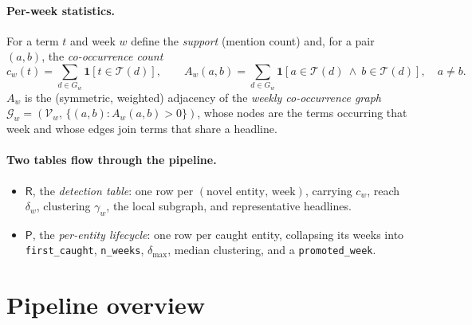 \documentclass[11pt]{article}
\newcommand{\ind}[1]{\mathbf{1}\!\left[#1\right]}        %
\newcommand{\Terms}{\mathcal{T}}                          %
\newcommand{\Vocab}{\mathcal{V}}                          %
\newcommand{\Gw}{G_{w}}                                   %
\renewcommand{\deg}{\delta}                               %
\newcommand{\clu}{\gamma}                                 %
\newcommand{\Rtab}{\mathsf{R}}
\newcommand{\Ptab}{\mathsf{P}}
\theoremstyle{definition}
\theoremstyle{remark}
\begin{document}
\paragraph{Per-week statistics.}
For a term $t$ and week $w$ define the \emph{support} (mention count) and, for a pair $(a,b)$,
the \emph{co-occurrence count}
\begin{equation}
c_w(t)=\sum_{d\in\Gw}\ind{t\in\Terms(d)},\qquad
A_w(a,b)=\sum_{d\in\Gw}\ind{a\in\Terms(d)\ \wedge\ b\in\Terms(d)},\quad a\ne b.
\label{eq:counts}
\end{equation}
$A_w$ is the (symmetric, weighted) adjacency of the \emph{weekly co-occurrence graph}
$\mathcal{G}_w=(\Vocab_w,\,\{(a,b):A_w(a,b)>0\})$, whose nodes are the terms occurring that
week and whose edges join terms that share a headline.

\paragraph{Two tables flow through the pipeline.}
\begin{itemize}[leftmargin=1.4em]
  \item $\Rtab$, the \emph{detection table}: one row per $(\text{novel entity},\,\text{week})$,
        carrying $c_w$, reach $\deg_w$, clustering $\clu_w$, the local subgraph, and
        representative headlines.
  \item $\Ptab$, the \emph{per-entity lifecycle}: one row per caught entity, collapsing its
        weeks into \texttt{first\_caught}, \texttt{n\_weeks}, $\deg_{\max}$, median clustering,
        and a \texttt{promoted\_week}.
\end{itemize}

\section{Pipeline overview}
\end{document}
